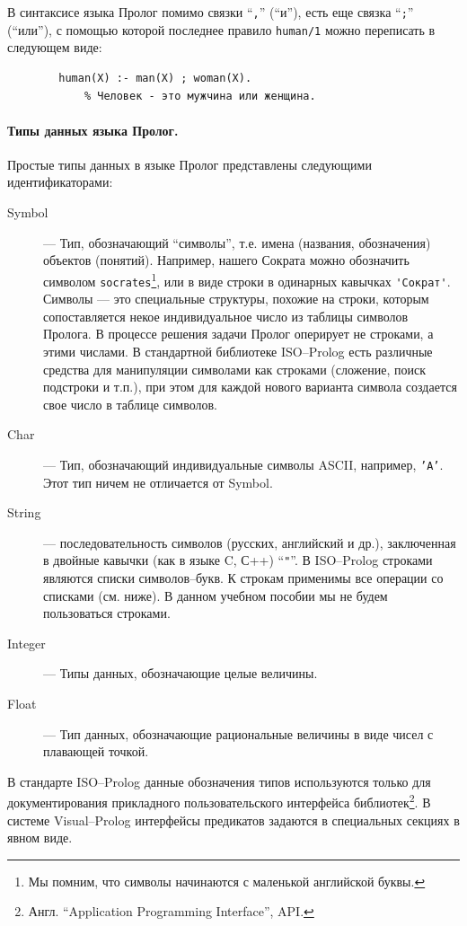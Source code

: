 \documentclass[12pt, openany, twoside]{book} %
\begin{document}
В синтаксисе языка Пролог помимо связки ``{\tt ,}'' (``и''), есть еще связка ``{\tt ;}'' (``или''), с помощью которой последнее правило {\tt human/1} можно переписать в следующем виде:
{\tt\begin{verbatim}
        human(Х) :- man(Х) ; woman(Х).
            % Человек - это мужчина или женщина.
\end{verbatim}}

\paragraph{Типы данных языка Пролог.} Простые типы данных в языке Пролог представлены следующими идентификаторами:
\begin{description}
\item[Symbol] --- Тип, обозначающий ``символы'', т.е. имена (названия, обозначения) объектов (понятий). Например, нашего Сократа можно обозначить символом {\tt socrates}\footnote{Мы помним, что символы начинаются с маленькой английской буквы.}, или в виде строки в одинарных кавычках {\tt \verb|'Сократ'|}. Символы --- это специальные структуры, похожие на строки, которым сопоставляется некое индивидуальное число из таблицы символов Пролога. В процессе решения задачи Пролог оперирует не строками, а этими числами. В стандартной библиотеке ISO--Prolog есть различные средства для манипуляции символами как строками (сложение, поиск подстроки и т.п.), при этом для каждой нового варианта символа создается свое число в таблице символов.

\item[Char] --- Тип, обозначающий индивидуальные символы ASCII, например, {\tt 'A'}. Этот тип ничем не отличается от Symbol.

\item[String] --- последовательность символов (русских, английский и др.), заключенная в двойные кавычки (как в языке C, С++) ``{\tt \verb|"|}''. В ISO--Prolog строками являются списки символов--букв. К строкам применимы все операции со списками (см. ниже). В данном учебном пособии мы не будем пользоваться строками.

\item[Integer] --- Типы данных, обозначающие целые величины.
\item[Float] --- Тип данных, обозначающие рациональные величины в виде чисел с плавающей точкой.
\end{description}
В стандарте ISO--Prolog данные обозначения типов используются только для документирования прикладного пользовательского интерфейса библиотек\footnote{Англ. ``Application Programming Interface'', API.}. В системе Visual--Prolog интерфейсы предикатов задаются в специальных секциях в явном виде.
\end{document}
